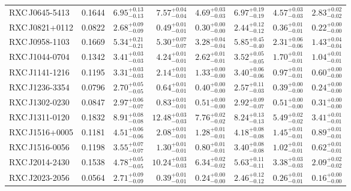 \documentclass[oldversion]{aa}
\begin{document}
\begin{table}
\begin{center}
\begin{tabular}{l l l r r l r r}
RXC\,J0645-5413 & 0.1644 & $6.95_{-0.13}^{+0.13}$ & $ 7.57_{-0.04}^{+0.04}$ & $ 4.69_{-0.03}^{+0.03}$ & $6.97_{-0.19}^{+0.19}$ & $ 4.57_{-0.03}^{+0.03}$ & $ 2.83_{-0.02}^{+0.02}$ \\
RXC\,J0821+0112 & 0.0822 & $2.68_{-0.09}^{+0.09}$ & $ 0.49_{-0.01}^{+0.01}$ & $ 0.30_{-0.00}^{+0.00}$ & $2.44_{-0.12}^{+0.12}$ & $ 0.36_{-0.01}^{+0.01}$ & $ 0.22_{-0.00}^{+0.00}$ \\
RXC\,J0958-1103 & 0.1669 & $5.34_{-0.21}^{+0.21}$ & $ 5.30_{-0.07}^{+0.07}$ & $ 3.28_{-0.04}^{+0.04}$ & $5.85_{-0.40}^{+0.45}$ & $ 2.31_{-0.06}^{+0.06}$ & $ 1.43_{-0.04}^{+0.04}$ \\
RXC\,J1044-0704 & 0.1342 & $3.41_{-0.03}^{+0.03}$ & $ 4.24_{-0.01}^{+0.01}$ & $ 2.62_{-0.01}^{+0.01}$ & $3.52_{-0.05}^{+0.05}$ & $ 1.70_{-0.01}^{+0.01}$ & $ 1.04_{-0.01}^{+0.01}$ \\
RXC\,J1141-1216 & 0.1195 & $3.31_{-0.03}^{+0.03}$ & $ 2.14_{-0.01}^{+0.01}$ & $ 1.33_{-0.00}^{+0.00}$ & $3.40_{-0.06}^{+0.06}$ & $ 0.97_{-0.01}^{+0.01}$ & $ 0.60_{-0.00}^{+0.00}$ \\
RXC\,J1236-3354 & 0.0796 & $2.70_{-0.05}^{+0.05}$ & $ 0.64_{-0.01}^{+0.01}$ & $ 0.40_{-0.00}^{+0.00}$ & $2.57_{-0.03}^{+0.11}$ & $ 0.39_{-0.00}^{+0.00}$ & $ 0.24_{-0.00}^{+0.00}$ \\
RXC\,J1302-0230 & 0.0847 & $2.97_{-0.07}^{+0.06}$ & $ 0.83_{-0.01}^{+0.01}$ & $ 0.51_{-0.00}^{+0.00}$ & $2.92_{-0.07}^{+0.09}$ & $ 0.51_{-0.00}^{+0.00}$ & $ 0.31_{-0.00}^{+0.00}$ \\
RXC\,J1311-0120 & 0.1832 & $8.91_{-0.08}^{+0.08}$ & $12.48_{-0.03}^{+0.03}$ & $ 7.76_{-0.02}^{+0.02}$ & $8.24_{-0.13}^{+0.13}$ & $ 5.49_{-0.02}^{+0.02}$ & $ 3.41_{-0.01}^{+0.01}$ \\
RXC\,J1516+0005 & 0.1181 & $4.51_{-0.06}^{+0.06}$ & $ 2.08_{-0.01}^{+0.01}$ & $ 1.28_{-0.01}^{+0.01}$ & $4.18_{-0.08}^{+0.08}$ & $ 1.45_{-0.01}^{+0.01}$ & $ 0.89_{-0.01}^{+0.01}$ \\
RXC\,J1516-0056 & 0.1198 & $3.55_{-0.07}^{+0.07}$ & $ 1.30_{-0.01}^{+0.01}$ & $ 0.80_{-0.01}^{+0.01}$ & $3.40_{-0.08}^{+0.08}$ & $ 1.02_{-0.01}^{+0.01}$ & $ 0.62_{-0.01}^{+0.01}$ \\
RXC\,J2014-2430 & 0.1538 & $4.78_{-0.05}^{+0.05}$ & $10.24_{-0.03}^{+0.03}$ & $ 6.34_{-0.02}^{+0.02}$ & $5.63_{-0.11}^{+0.11}$ & $ 3.38_{-0.03}^{+0.03}$ & $ 2.09_{-0.02}^{+0.02}$ \\
RXC\,J2023-2056 & 0.0564 & $2.71_{-0.09}^{+0.09}$ & $ 0.39_{-0.01}^{+0.01}$ & $ 0.24_{-0.00}^{+0.00}$ & $2.46_{-0.12}^{+0.12}$ & $ 0.26_{-0.01}^{+0.01}$ & $ 0.16_{-0.00}^{+0.00}$ \\

\end{tabular}
\end{center}
\end{table}
\end{document}
